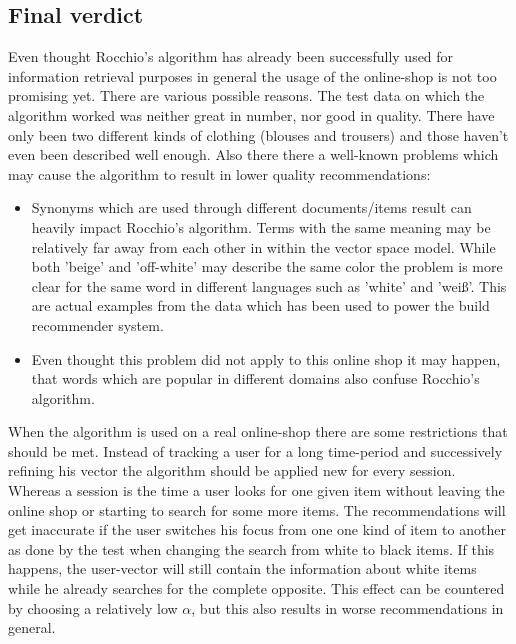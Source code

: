 \subsection{Final verdict}
Even thought Rocchio's algorithm has already been successfully used for information retrieval purposes in general \citep[p.~183]{manning:2009} the usage of the online-shop is not too promising yet.
There are various possible reasons.
The test data on which the algorithm worked was neither great in number, nor good in quality.
There have only been two different kinds of clothing (blouses and trousers) and those haven't even been described well enough.
Also there there a well-known problems which may cause the algorithm to result in lower quality recommendations:
\begin{itemize}

    \item Synonyms which are used through different documents/items result can heavily impact Rocchio's algorithm.
        Terms with the same meaning may be relatively far away from each other in within the vector space model.
        \citep[p.~184]{manning:2009}
        While both 'beige' and 'off-white' may describe the same color the problem is more clear for the same word in different languages such as 'white' and 'wei\ss{}'.
        This are actual examples from the data which has been used to power the build recommender system.

    \item Even thought this problem did not apply to this online shop it may happen, that words which are popular in different domains also confuse Rocchio's algorithm.
    \citep[p.~184]{manning:2009}
\end{itemize}

\noindent
When the algorithm is used on a real online-shop there are some restrictions that should be met.
Instead of tracking a user for a long time-period and successively refining his vector the algorithm should be applied new for every session.
Whereas a session is the time a user looks for one given item without leaving the online shop or starting to search for some more items.
The recommendations will get inaccurate if the user switches his focus from one one kind of item to another as done by the test when changing the search from white to black items.
If this happens, the user-vector will still contain the information about white items while he already searches for the complete opposite.
This effect can be countered by choosing a relatively low $\alpha$, but this also results in worse recommendations in general.
\\

